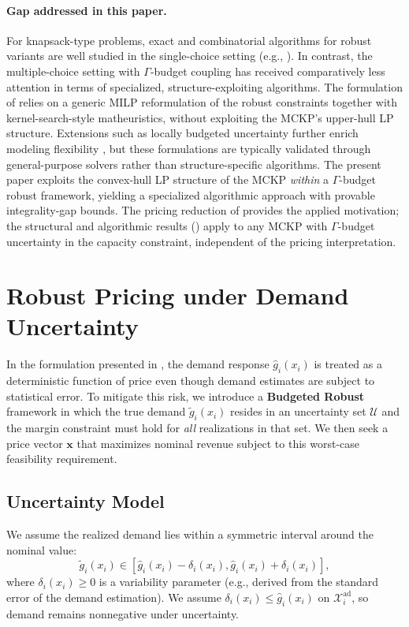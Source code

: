 \documentclass[11pt, a4paper]{article}
\theoremstyle{plain}
\theoremstyle{definition}
\theoremstyle{remark}
\begin{document}
\paragraph{Gap addressed in this paper.}
For knapsack-type problems, exact and combinatorial algorithms for robust variants are well studied in the single-choice setting
(e.g., \citealp{Monaci2013}). In contrast, the multiple-choice setting with $\Gamma$-budget coupling has received comparatively less attention in terms of specialized, structure-exploiting algorithms. The formulation of \citet{Caserta2019} relies
on a generic MILP reformulation of the robust constraints together with kernel-search-style matheuristics, without exploiting the MCKP's
upper-hull LP structure. Extensions such as locally budgeted uncertainty further enrich modeling flexibility \citep{Goerigk2021}, but these
formulations are typically validated through general-purpose solvers rather than structure-specific algorithms. The present paper exploits the
convex-hull LP structure of the MCKP \emph{within} a $\Gamma$-budget robust framework, yielding a specialized algorithmic approach with
provable integrality-gap bounds. The pricing reduction of  provides the applied motivation; the
structural and algorithmic results () apply to any MCKP with $\Gamma$-budget uncertainty in the capacity
constraint, independent of the pricing interpretation.
\section{Robust Pricing under Demand Uncertainty}\label{sec:robust}

In the formulation presented in , the demand response $\hat{g}_i(x_i)$ is treated as a deterministic function of price even though demand estimates are subject to statistical error. To mitigate this risk, we introduce a \textbf{Budgeted Robust} framework in which the true demand $\tilde{g}_i(x_i)$ resides in an uncertainty set $\mathcal U$ and the margin constraint must hold for \textit{all} realizations in that set. We then seek a price vector $\bm{x}$ that maximizes nominal revenue subject to this worst-case feasibility requirement.

\subsection{Uncertainty Model}
We assume the realized demand lies within a symmetric interval around the nominal value:
\begin{equation}
    \tilde{g}_i(x_i) \in [\hat{g}_i(x_i) - \delta_i(x_i), \hat{g}_i(x_i) + \delta_i(x_i)],
\end{equation}
where $\delta_i(x_i) \ge 0$ is a variability parameter (e.g., derived from the standard error of the demand estimation). We assume $\delta_i(x_i)\le \hat g_i(x_i)$ on $\mathcal X_i^{\mathrm{ad}}$, so demand remains nonnegative under uncertainty.
\end{document}
